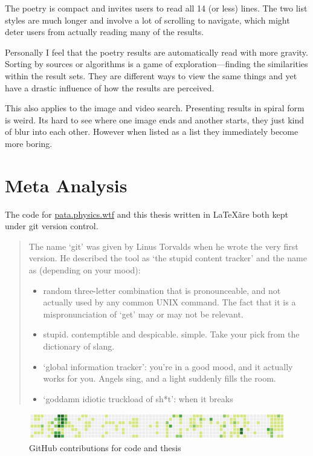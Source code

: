 The poetry is compact and invites users to read all \num{14} (or less) lines. The two list styles are much longer and involve a lot of scrolling to navigate, which might deter users from actually reading many of the results.

Personally I feel that the poetry results are automatically read with more gravity. Sorting by sources or algorithms is a game of exploration---finding the similarities within the result sets. They are different ways to view the same things and yet have a drastic influence of how the results are perceived. 

This also applies to the image and video search. Presenting results in spiral form is weird. Its hard to see where one image ends and another starts, they just kind of blur into each other. However when listed as a list they immediately become more boring.


\section{Meta Analysis}

The code for \url{pata.physics.wtf} and this thesis written in \LaTeX \~are both kept under git version control.

\begin{quotation}
  The name `git' was given by Linus Torvalds when he wrote the very first version. He described the tool as `the stupid content tracker' and the name as (depending on your mood):
  \begin{itemize}
    \item random three-letter combination that is pronounceable, and not actually used by any common UNIX command. The fact that it is a mispronunciation of `get' may or may not be relevant.
    \item stupid. contemptible and despicable. simple. Take your pick from the dictionary of slang.
    \item `global information tracker': you're in a good mood, and it actually works for you. Angels sing, and a light suddenly fills the room.
    \item `goddamn idiotic truckload of sh*t': when it breaks 
  \end{itemize} 
\end{quotation}

\begin{figure}[!htbp] %
  \centering
  \includegraphics[width=\linewidth]{images/github0}
\caption[GitHub contributions]{GitHub contributions for code and thesis}
\label{img:github}
\end{figure}

